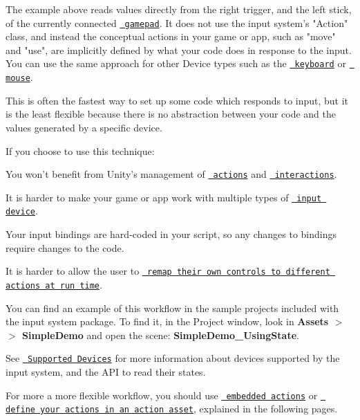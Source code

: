 The example above reads values directly from the right trigger, and the left stick, of the currently connected \href{Gamepad.html}{\texttt{ gamepad}}. It does not use the input system’s "{}\+Action"{} class, and instead the conceptual actions in your game or app, such as "{}move"{} and "{}use"{}, are implicitly defined by what your code does in response to the input. You can use the same approach for other Device types such as the \href{../api/UnityEngine.InputSystem.Keyboard.html}{\texttt{ keyboard}} or \href{../api/UnityEngine.InputSystem.Mouse.html}{\texttt{ mouse}}.

This is often the fastest way to set up some code which responds to input, but it is the least flexible because there is no abstraction between your code and the values generated by a specific device.

If you choose to use this technique\+:


\begin{DoxyItemize}
\item You won’t benefit from Unity’s management of \href{Actions.html}{\texttt{ actions}} and \href{Interactions.html}{\texttt{ interactions}}.
\item It is harder to make your game or app work with multiple types of \href{Devices.html}{\texttt{ input device}}.
\item Your input bindings are hard-\/coded in your script, so any changes to bindings require changes to the code.
\item It is harder to allow the user to \href{ActionBindings.html\#interactive-rebinding}{\texttt{ remap their own controls to different actions at run time}}.
\end{DoxyItemize}

You can find an example of this workflow in the sample projects included with the input system package. To find it, in the Project window, look in {\bfseries{Assets \texorpdfstring{$>$}{>}  \texorpdfstring{$>$}{>} Simple\+Demo}} and open the scene\+: {\bfseries{Simple\+Demo\+\_\+\+Using\+State}}.

See \href{SupportedDevices.html}{\texttt{ Supported Devices}} for more information about devices supported by the input system, and the API to read their states.

For more a more flexible workflow, you should use \href{Workflow-Embedded.html}{\texttt{ embedded actions}} or \href{Workflow-ActionsAsset.html}{\texttt{ define your actions in an action asset}}, explained in the following pages. 